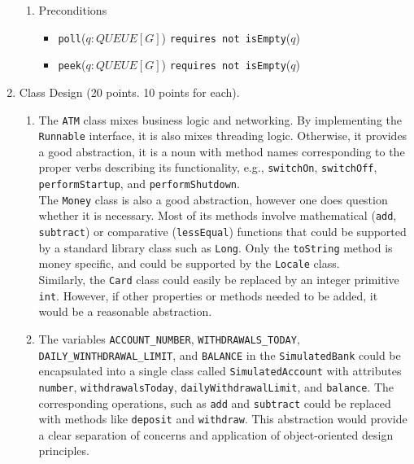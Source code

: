\documentclass{report}
\begin{document}
\begin{enumerate}
\begin{enumerate}
		\item Preconditions		
		\begin{itemize}
			\item \texttt{poll}($q: QUEUE[G]$) \texttt{requires not isEmpty}($q$)
            \item \texttt{peek}($q: QUEUE[G]$) \texttt{requires not isEmpty}($q$)
		\end{itemize}
	\end{enumerate}

	\item Class Design (20 points. 10 points for each).
	
	\begin{enumerate}
		\item 
		The \texttt{ATM} class mixes business logic and networking. By implementing the \texttt{Runnable} interface, it is also mixes threading logic. Otherwise, 
		it provides a good abstraction, it is a noun with method names corresponding
		to the proper verbs describing its functionality, e.g., \texttt{switchOn},
		\texttt{switchOff}, \texttt{performStartup}, and \texttt{performShutdown}. \\
		
		The \texttt{Money} class is also a good abstraction, however one does question
		whether it is necessary. Most of its methods involve mathematical
    	(\texttt{add}, \texttt{subtract}) or comparative (\texttt{lessEqual})
    	functions that could be supported by a standard library class such as \texttt{Long}. Only the \texttt{toString} method is money specific,
    	and could be supported by the \texttt{Locale} class. \\
    	
    	Similarly, the \texttt{Card} class could easily be replaced by an
    	integer primitive \texttt{int}. However, if other properties or methods
    	needed to be added, it would be a reasonable abstraction.
		
		\item The variables \texttt{ACCOUNT\_NUMBER}, \texttt{WITHDRAWALS\_TODAY}, \texttt{DAILY\_WINTHDRAWAL\_LIMIT}, and \texttt{BALANCE}
		in the \texttt{SimulatedBank} could be encapsulated into
		a single class called \texttt{SimulatedAccount} with
		attributes \texttt{number}, \texttt{withdrawalsToday},
		\texttt{dailyWithdrawalLimit}, and \texttt{balance}.
        The corresponding operations, such as \texttt{add} and
        \texttt{subtract} could be replaced with methods like
        \texttt{deposit} and \texttt{withdraw}. This abstraction
        would provide a clear separation of concerns and 
        application of object-oriented design principles.
	\end{enumerate}


\end{enumerate}
\end{document}

